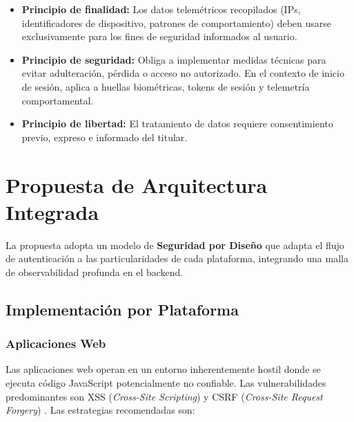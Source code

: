 \documentclass[12pt, a4paper]{article}
\begin{document}
\begin{itemize}[noitemsep]
  \item \textbf{Principio de finalidad:} Los datos telemétricos recopilados
        (IPs, identificadores de dispositivo, patrones de comportamiento) deben
        usarse exclusivamente para los fines de seguridad informados al usuario.
  \item \textbf{Principio de seguridad:} Obliga a implementar medidas técnicas
        para evitar adulteración, pérdida o acceso no autorizado. En el contexto
        de inicio de sesión, aplica a huellas biométricas, tokens de sesión y
        telemetría comportamental.
  \item \textbf{Principio de libertad:} El tratamiento de datos requiere
        consentimiento previo, expreso e informado del titular.
\end{itemize}

\section{Propuesta de Arquitectura Integrada}

La propuesta adopta un modelo de \textbf{Seguridad por Diseño} que adapta el
flujo de autenticación a las particularidades de cada plataforma, integrando
una malla de observabilidad profunda en el backend.

\subsection{Implementación por Plataforma}

\subsubsection{Aplicaciones Web}

Las aplicaciones web operan en un entorno inherentemente hostil donde se ejecuta
código JavaScript potencialmente no confiable. Las vulnerabilidades predominantes
son XSS (\textit{Cross-Site Scripting}) y CSRF
(\textit{Cross-Site Request Forgery}) \cite{stackhawk2025}. Las estrategias
recomendadas son:
\end{document}
